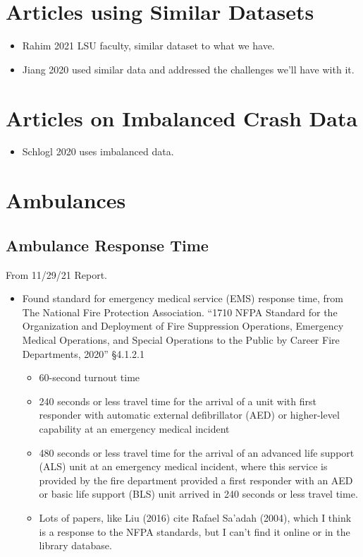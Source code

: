 \section{Articles using Similar Datasets}

\begin{itemize}
	\item Rahim 2021 \cite{RAHIM2021106090} LSU faculty, similar dataset to what we have.  
	\item Jiang 2020 \cite{JIANG2020105520} used similar data and addressed the challenges we'll have with it.  
	
\end{itemize}

\section{Articles on Imbalanced Crash Data}

\begin{itemize}
	\item  Schlogl 2020 \cite{SCHLOGL2020105398} uses imbalanced data.
\end{itemize}

\section{Ambulances}

\subsection{Ambulance Response Time}

From 11/29/21 Report.

\begin{itemize}
	\item Found standard for emergency medical service (EMS) response time, from The National Fire Protection Association.
	``1710 NFPA Standard for the Organization and Deployment of Fire Suppression Operations, Emergency Medical Operations,  and Special Operations to the Public by Career Fire Departments, 2020''
	  \S 4.1.2.1
	\begin{itemize}
		\item 60-second turnout time 
		\item 240  seconds  or  less  travel  time  for  the  arrival  of  a  unit with  first  responder  with  automatic  external  defibrillator (AED) or higher-level capability at an emergency medical incident
		\item 480 seconds or less travel time for the arrival of an advanced  life  support  (ALS)  unit  at  an  emergency  medical  incident,  where  this  service  is  provided  by  the  fire department  provided  a  first  responder  with  an  AED  or basic  life  support  (BLS)  unit  arrived  in  240  seconds  or less travel time.
		\item Lots of papers, like Liu (2016)\cite{Liu_2016} cite Rafael Sa'adah (2004), which I think is a response to the NFPA standards, but I can't find it online or in the library database.
	\end{itemize}	
\end{itemize}

